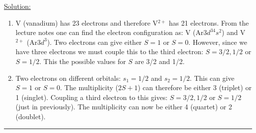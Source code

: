 \noindent
\underline{Solution:}\\

\begin{enumerate}
\item V (vanadium) has 23 electrons and therefore V$^{2+}$ has 21 electrons. From the lecture notes one can find the electron configuration as: V (Ar$3d^34s^2$) and V$^{2+}$ (Ar$3d^3$). Two electrons can give either $S = 1$ or $S = 0$. However, since we have three electrons we must couple this to the third electron: $S = 3/2, 1/2$ or $S = 1/2$. This the possible values for $S$ are 3/2 and 1/2.

\item Two electrons on different orbitals: $s_1 = 1/2$ and $s_2 = 1/2$. This can give $S = 1$ or $S = 0$. The multiplicity ($2S + 1$) can therefore be either 3 (triplet) or 1 (singlet). Coupling a third electron to this gives: $S = 3/2, 1/2$ or $S = 1/2$ (just in previously). The multiplicity can now be either 4 (quartet) or 2 (doublet).

\end{enumerate}

\hrule\vspace{0.5cm}
